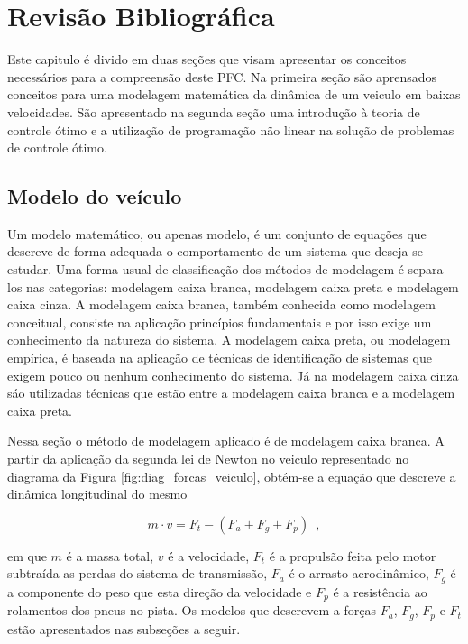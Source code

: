 \chapter[Revisão Bibliográfica]{Revisão Bibliográfica}
\label{chap:revisao_bibliografica}
\thispagestyle{empty}

Este capitulo é divido em duas seções que visam apresentar os conceitos necessários para a compreensão deste PFC.
Na primeira seção são aprensados conceitos para uma modelagem matemática da dinâmica de um veiculo em baixas velocidades.
São apresentado na segunda seção uma introdução à teoria de controle ótimo e a utilização de programação não linear na solução
de problemas de controle ótimo.

\section{Modelo do veículo}
\label{sec:modelo}

Um modelo matemático, ou apenas modelo, é um conjunto de equações que descreve de forma adequada o comportamento de um sistema que deseja-se estudar.
Uma forma usual de classificação dos métodos de modelagem é separa-los nas categorias: modelagem caixa branca, modelagem caixa preta e modelagem
caixa cinza.
A modelagem caixa branca, também conhecida como modelagem conceitual, consiste na aplicação princípios fundamentais e por isso exige um conhecimento
da natureza do sistema.
A modelagem caixa preta, ou modelagem empírica, é baseada na aplicação de técnicas de identificação de sistemas que exigem pouco ou
nenhum conhecimento do sistema.
Já na modelagem caixa cinza sáo utilizadas técnicas que estão entre a modelagem caixa branca e a modelagem caixa preta\cite{book:Aguirre}.

Nessa seção o método de modelagem aplicado é de modelagem caixa branca. A partir da aplicação da segunda lei de Newton no
veiculo representado no diagrama da Figura \ref{fig:diag_forcas_veiculo}, obtém-se a equação que descreve a dinâmica longitudinal do mesmo

\begin{equation}
	\label{eq:SomaForcas}
	m \cdot \dot v	= F_t - (F_a +	F_g + F_p)
	\enspace,
\end{equation}

em que $m$ é a massa total, $v$ é a velocidade, $F_{t}$ é a propulsão feita pelo motor subtraída as perdas do sistema de transmissão, $F_{a}$ é o
arrasto aerodinâmico, $F_g$ é a componente do peso que esta direção da velocidade e $F_{p}$ é a resistência ao rolamentos dos pneus no pista.
Os modelos que descrevem a forças $F_{a}$, $F_g$, $F_{p}$ e $F_{t}$ estão apresentados nas subseções a seguir.

